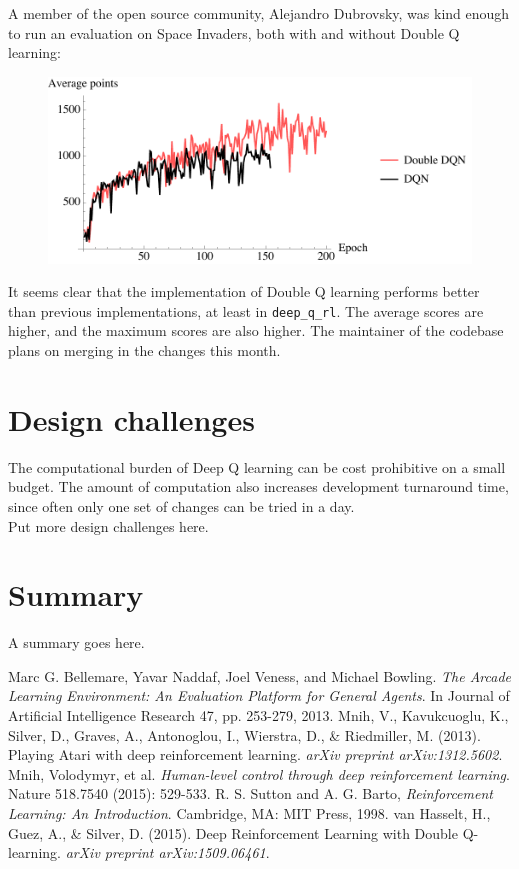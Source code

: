 \documentclass{article}
\begin{document}
  A member of the open source community, Alejandro Dubrovsky, was kind enough to run an evaluation on Space Invaders, both with and without Double Q learning:
  \begin{figure}[H]
    \centering
    \includegraphics[width=120mm]{dqn_si_rewardper.pdf}
  \end{figure}
  It seems clear that the implementation of Double Q learning performs better than previous implementations, at least in \texttt{deep\_q\_rl}. The average scores are higher, and the maximum scores are also higher. The maintainer of the codebase plans on merging in the changes this month.

\section{Design challenges}
The computational burden of Deep Q learning can be cost prohibitive on a small budget. The amount of computation also increases development turnaround time, since often only one set of changes can be tried in a day. \\

Put more design challenges here.

\section{Summary}
A summary goes here.


\begin{thebibliography}{1}
 Marc G. Bellemare, Yavar Naddaf, Joel Veness, and Michael Bowling. {\em The Arcade Learning Environment: An Evaluation Platform for General Agents}. In Journal of Artificial Intelligence Research 47, pp. 253-279, 2013.
 Mnih, V., Kavukcuoglu, K., Silver, D., Graves, A., Antonoglou, I., Wierstra, D., \& Riedmiller, M. (2013). Playing Atari with deep reinforcement learning. \textit{arXiv preprint arXiv:1312.5602}.
 Mnih, Volodymyr, et al. {\em Human-level control through deep reinforcement learning}. Nature 518.7540 (2015): 529-533.
 R. S. Sutton and A. G. Barto, {\em Reinforcement Learning: An Introduction}. Cambridge, MA: MIT Press, 1998.
 van Hasselt, H., Guez, A., \& Silver, D. (2015). Deep Reinforcement Learning with Double Q-learning. \textit{arXiv preprint arXiv:1509.06461}.
\end{thebibliography}



\pagebreak
\end{document}
